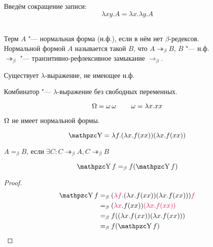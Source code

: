 Введём сокращение записи:
\[
    \lambda x y . A = \lambda x . \lambda y . A
\]

\begin{definition} \mbox{} \\
    Терм $A$ "--- нормальная форма (н.ф.), если в нём нет $\beta$-редексов. \\
    Нормальной формой $A$ называется такой $B$, что $A \twoheadrightarrow_{\beta} B$, $B$ "--- н.ф. \\
    $\twoheadrightarrow_{\beta}$ "--- транзитивно-рефлексивное замыкание $\rightarrow_{\beta}$.
\end{definition}

\begin{statement}
    Существует $\lambda$-выражение, не имеющее н.ф.
\end{statement}

\begin{definition}[комбинатор]
    Комбинатор "--- $\lambda$-выражение без свободных переменных.
\end{definition}

\begin{definition}
\[
    \operatorname{\Omega} = \operatorname{\omega} \operatorname{\omega} \qquad
    \operatorname{\omega} = \lambda x . x x
\]
\end{definition}

$\operatorname{\Omega}$ не имеет нормальной формы.

\begin{definition}
    \[
        \comb Y = \lambda f . (\lambda x . f (x x)) (\lambda x . f (x x))
    \]
\end{definition}

\begin{definition}
    $A=_{\beta}B$, если $\exists C : C \twoheadrightarrow_{\beta} A, C \twoheadrightarrow_{\beta}B$
\end{definition}

\begin{statement}
    \[
        \comb Yf =_{\beta} f(\comb Yf)
    \]
\end{statement}

\begin{proof}
    \begin{align*}
        \comb Yf &=_{\beta} (\reduction{\lambda f} . (\lambda x . f (x x)) (\lambda x . f (x x))) \reduction f \\
                 &=_{\beta} (\reduction{\lambda x} . f (x x)) \reduction{(\lambda x . f (x x))} \\
                 &=_{\beta} f ((\lambda x . f (x x)) (\lambda x . f (x x))) \\
                 &=_{\beta} f (\comb Y f)
    \qedhere
    \end{align*}
\end{proof}

